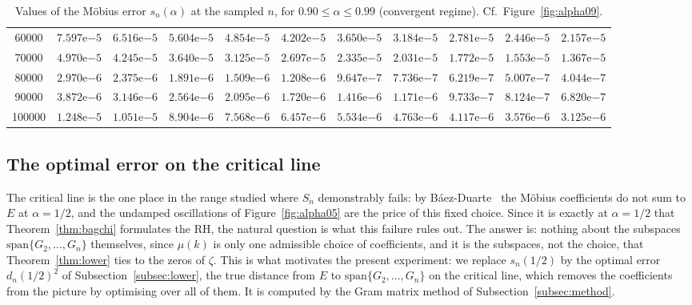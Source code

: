 \documentclass[11pt]{extarticle}
\numberwithin{equation}{section}
\theoremstyle{plain}
\theoremstyle{definition}
\begin{document}
\begin{table}[ht!]
{\begin{tabular}{|c|c|c|c|c|c|c|c|c|c|c|}
60000  & $7.597\mathrm{e}{-5}$ & $6.516\mathrm{e}{-5}$ & $5.604\mathrm{e}{-5}$ & $4.854\mathrm{e}{-5}$ & $4.202\mathrm{e}{-5}$ & $3.650\mathrm{e}{-5}$ & $3.184\mathrm{e}{-5}$ & $2.781\mathrm{e}{-5}$ & $2.446\mathrm{e}{-5}$ & $2.157\mathrm{e}{-5}$ \\
70000  & $4.970\mathrm{e}{-5}$ & $4.245\mathrm{e}{-5}$ & $3.640\mathrm{e}{-5}$ & $3.125\mathrm{e}{-5}$ & $2.697\mathrm{e}{-5}$ & $2.335\mathrm{e}{-5}$ & $2.031\mathrm{e}{-5}$ & $1.772\mathrm{e}{-5}$ & $1.553\mathrm{e}{-5}$ & $1.367\mathrm{e}{-5}$ \\
80000  & $2.970\mathrm{e}{-6}$ & $2.375\mathrm{e}{-6}$ & $1.891\mathrm{e}{-6}$ & $1.509\mathrm{e}{-6}$ & $1.208\mathrm{e}{-6}$ & $9.647\mathrm{e}{-7}$ & $7.736\mathrm{e}{-7}$ & $6.219\mathrm{e}{-7}$ & $5.007\mathrm{e}{-7}$ & $4.044\mathrm{e}{-7}$ \\
90000  & $3.872\mathrm{e}{-6}$ & $3.146\mathrm{e}{-6}$ & $2.564\mathrm{e}{-6}$ & $2.095\mathrm{e}{-6}$ & $1.720\mathrm{e}{-6}$ & $1.416\mathrm{e}{-6}$ & $1.171\mathrm{e}{-6}$ & $9.733\mathrm{e}{-7}$ & $8.124\mathrm{e}{-7}$ & $6.820\mathrm{e}{-7}$ \\
100000 & $1.248\mathrm{e}{-5}$ & $1.051\mathrm{e}{-5}$ & $8.904\mathrm{e}{-6}$ & $7.568\mathrm{e}{-6}$ & $6.457\mathrm{e}{-6}$ & $5.534\mathrm{e}{-6}$ & $4.763\mathrm{e}{-6}$ & $4.117\mathrm{e}{-6}$ & $3.576\mathrm{e}{-6}$ & $3.125\mathrm{e}{-6}$ \\
\hline
\end{tabular}}
\caption{Values of the M\"obius error $s_n(\alpha)$ at the sampled $n$, for $0.90 \leq \alpha \leq 0.99$ (convergent regime). Cf.\ Figure~\ref{fig:alpha09}.}
\label{tab:alpha09}
\end{table}

\subsection{The optimal error on the critical line}\label{subsec:dn}

The critical line is the one place in the range studied where $S_n$ demonstrably
fails: by B\'aez-Duarte~\cite{baez-unitary} the Möbius coefficients do not sum to
$E$ at $\alpha = 1/2$, and the undamped oscillations of Figure~\ref{fig:alpha05}
are the price of this fixed choice. Since it is exactly at $\alpha = 1/2$ that
Theorem~\ref{thm:bagchi} formulates the RH, the natural question is what this
failure rules out. The answer is: nothing about the subspaces
$\mathrm{span}\{G_2, \dots, G_n\}$ themselves, since $\mu(k)$ is only one
admissible choice of coefficients, and it is the subspaces, not the choice, that
Theorem~\ref{thm:lower} ties to the zeros of $\zeta$. This is what motivates the
present experiment: we replace $s_n(1/2)$ by the optimal error $d_n(1/2)^2$ of
Subsection~\ref{subsec:lower}, the true distance from $E$ to
$\mathrm{span}\{G_2, \dots, G_n\}$ on the critical line, which removes the
coefficients from the picture by optimising over all of them. It is computed by
the Gram matrix method of Subsection~\ref{subsec:method}.
\end{document}
